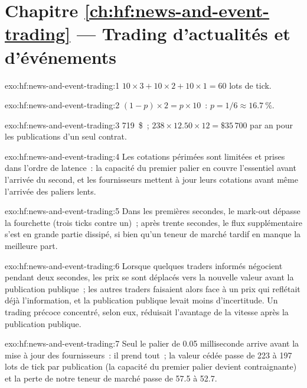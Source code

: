 \section*{Chapitre \ref{ch:hf:news-and-event-trading} --- Trading d'actualités et d'événements}

\begin{solution}{exo:hf:news-and-event-trading:1}
$10\times3+10\times2+10\times1=60$ lots de tick.
\end{solution}

\begin{solution}{exo:hf:news-and-event-trading:2}
$(1-p)\times2=p\times10$~: $p=1/6\approx16.7~\%$.
\end{solution}

\begin{solution}{exo:hf:news-and-event-trading:3}
719~\$~; $238\times12.50\times12=\$35\,700$ par an pour les publications d'un seul contrat.
\end{solution}

\begin{solution}{exo:hf:news-and-event-trading:4}
Les cotations périmées sont limitées et prises dans l'ordre de latence~: la capacité du premier palier en couvre l'essentiel avant l'arrivée du second, et les fournisseurs
mettent à jour leurs cotations avant même l'arrivée des paliers lents.
\end{solution}

\begin{solution}{exo:hf:news-and-event-trading:5}
Dans les premières secondes, le mark-out dépasse la fourchette (trois ticks contre un)~; après trente secondes, le flux supplémentaire s'est en grande partie dissipé, si bien qu'un teneur de marché tardif
en manque la meilleure part.
\end{solution}

\begin{solution}{exo:hf:news-and-event-trading:6}
Lorsque quelques traders informés négocient pendant deux secondes, les prix se sont déplacés vers la nouvelle valeur avant la publication publique~; les autres traders faisaient alors face à un prix qui
reflétait déjà l'information, et la publication publique levait moins d'incertitude. Un trading précoce concentré, selon eux, réduisait
l'avantage de la vitesse après la publication publique.
\end{solution}

\begin{solution}{exo:hf:news-and-event-trading:7}
Seul le palier de 0.05 milliseconde arrive avant la mise à jour des fournisseurs~: il prend tout~; la valeur cédée passe de 223 à 197 lots de tick par publication
(la capacité du premier palier devient contraignante) et la perte de notre teneur de marché passe de 57.5 à 52.7.
\end{solution}

